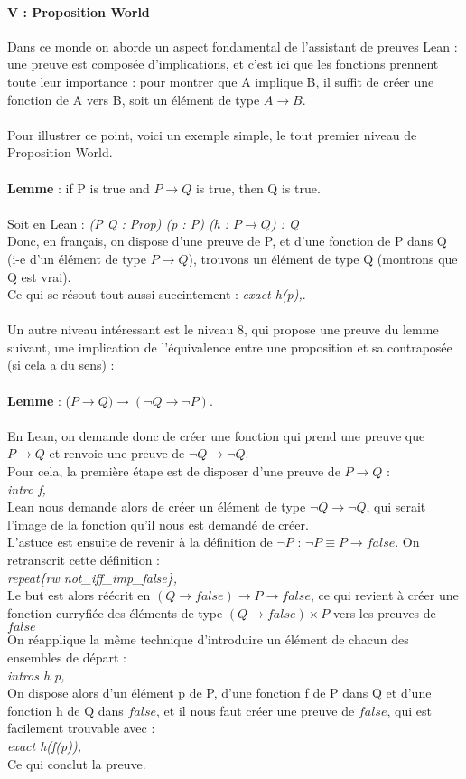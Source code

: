 \documentclass[french,frenchkw]{article}
\begin{document}
\paragraph{V : Proposition World} 
Dans ce monde on aborde un aspect fondamental de l'assistant de preuves Lean : une preuve est composée d'implications, et c'est ici que les fonctions prennent toute leur importance : pour montrer que A implique B, il suffit de créer une fonction de A vers B, soit un élément de type $A \to B$.\\
\\
Pour illustrer ce point, voici un exemple simple, le tout premier niveau de Proposition World. \\ \\
\textbf{Lemme} : if P is true and $P \to Q$ is true, then Q is true. \\ \\
Soit en Lean : \textit{(P Q : Prop) (p : P) (h : $P \to Q$) : Q} \\
Donc, en français, on dispose d'une preuve de P, et d'une fonction de P dans Q (i-e d'un élément de type $P \to Q$), trouvons un élément de type Q (montrons que Q est vrai). \\
Ce qui se résout tout aussi succintement : \textit{exact h(p),}.\\
\\
Un autre niveau intéressant est le niveau 8, qui propose une preuve du lemme suivant, une implication de l'équivalence entre une proposition et sa contraposée (si cela a du sens) : \\
\\
\textbf{Lemme} : ($P \to Q) \to (\lnot Q \to \lnot P)$. \\
\\
En Lean, on demande donc de créer une fonction qui prend une preuve que $P \to Q$ et renvoie une preuve de $\lnot Q \to \lnot Q$.
\\
Pour cela, la première étape est de disposer d'une preuve de $P \to Q$ :\\
\textit{intro f,}\\
Lean nous demande alors de créer un élément de type $\lnot Q \to \lnot Q$, qui serait l'image de la fonction qu'il nous est demandé de créer.\\
L'astuce est ensuite de revenir à la définition de $\lnot P$ :  $\lnot P \equiv P \to false$. On retranscrit cette définition : \\
\textit{repeat\{rw not\_iff\_imp\_false\},} \\
Le but est alors réécrit en $(Q \to false) \to P \to false$, ce qui revient à créer une fonction curryfiée des éléments de type $(Q \to false) \times P$ vers les preuves de $false$\\
On réapplique la même technique d'introduire un élément de chacun des ensembles de départ : \\
\textit{intros h p,}\\
On dispose alors d'un élément p de P, d'une fonction f de P dans Q et d'une fonction h de Q dans $false$, et il nous faut créer une preuve de $false$, qui est facilement trouvable avec : \\
\textit{exact h(f(p)),}\\
Ce qui conclut la preuve.
\end{document}
